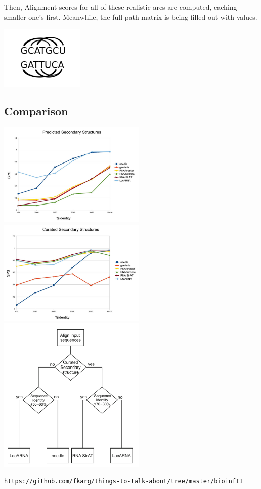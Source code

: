 \documentclass{scrartcl}
\begin{document}
Then, Alignment scores for all of these realistic arcs are
computed, caching smaller one's first. Meanwhile, the full path matrix is being
filled out with values.


\includegraphics[width=0.3\textwidth]{bioinfII/images/Arcs_example}

\newpage

\subsection*{Comparison}

\includegraphics[width=0.53\textwidth]{bioinfI/images/predicted} \\
\includegraphics[width=0.53\textwidth]{bioinfI/images/curated} \\
\includegraphics[width=0.53\textwidth]{bioinfI/images/flow}


\verb!https://github.com/fkarg/things-to-talk-about/tree/master/bioinfII!
\end{document}
